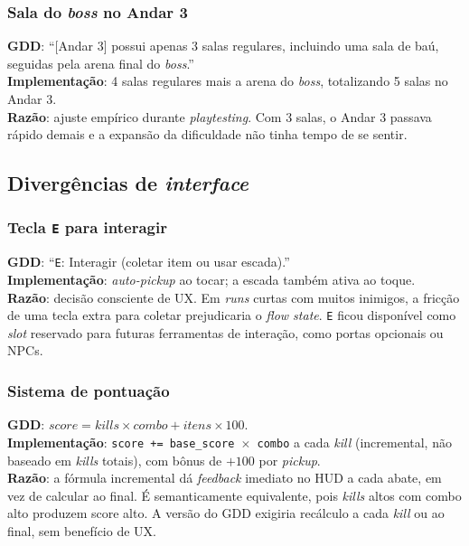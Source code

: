 \subsubsection*{Sala do \emph{boss} no Andar 3}

\textbf{GDD}: ``[Andar 3] possui apenas 3 salas regulares, incluindo uma sala de
baú, seguidas pela arena final do \emph{boss}.''\\
\textbf{Implementação}: 4 salas regulares mais a arena do \emph{boss}, totalizando
5 salas no Andar 3.\\
\textbf{Razão}: ajuste empírico durante \emph{playtesting}. Com 3 salas, o Andar
3 passava rápido demais e a expansão da dificuldade não tinha tempo de se sentir.

\subsection{Divergências de \emph{interface}}

\subsubsection*{Tecla \texttt{E} para interagir}

\textbf{GDD}: ``\texttt{E}: Interagir (coletar item ou usar escada).''\\
\textbf{Implementação}: \emph{auto-pickup} ao tocar; a escada também ativa ao
toque.\\
\textbf{Razão}: decisão consciente de UX. Em \emph{runs} curtas com muitos
inimigos, a fricção de uma tecla extra para coletar prejudicaria o \emph{flow
state}. \texttt{E} ficou disponível como \emph{slot} reservado para futuras
ferramentas de interação, como portas opcionais ou NPCs.

\subsubsection*{Sistema de pontuação}

\textbf{GDD}: $\mathit{score} = \mathit{kills} \times \mathit{combo} +
\mathit{itens} \times 100$.\\
\textbf{Implementação}: \texttt{score += base\_score $\times$ combo} a cada
\emph{kill} (incremental, não baseado em \emph{kills} totais), com bônus de
$+100$ por \emph{pickup}.\\
\textbf{Razão}: a fórmula incremental dá \emph{feedback} imediato no HUD a cada
abate, em vez de calcular ao final. É semanticamente equivalente, pois
\emph{kills} altos com combo alto produzem score alto. A versão do GDD exigiria
recálculo a cada \emph{kill} ou ao final, sem benefício de UX.

